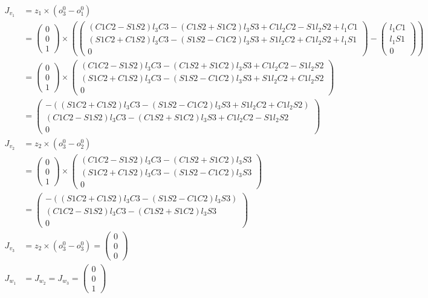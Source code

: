 \begin{align*}
J_{v_1} &= 
z_1\times (o_3^0-o_1^0)\\
 &=
\begin{pmatrix}
0 \\ 0 \\ 1
\end{pmatrix}\times\left(
\begin{pmatrix}
(C1C2-S1S2)l_3 C3-(C1S2+S1C2)l_3 S3+C1l_2C2-S1l_2S2+l_1C1 \\ (S1C2+C1S2)l_3 C3-(S1S2-C1C2)l_3 S3+S1l_2C2+C1l_2S2+l_1S1 \\ 0
\end{pmatrix}-
\begin{pmatrix}
l_1C1 \\ l_1S1 \\ 0
\end{pmatrix}
\right)\\
&=
\begin{pmatrix}
0 \\ 0 \\ 1
\end{pmatrix}\times
\begin{pmatrix}
(C1C2-S1S2)l_3 C3-(C1S2+S1C2)l_3 S3+C1l_2C2-S1l_2S2 \\ (S1C2+C1S2)l_3 C3-(S1S2-C1C2)l_3 S3+S1l_2C2+C1l_2S2 \\ 0
\end{pmatrix}
\\
&=
\begin{pmatrix}
-((S1C2+C1S2)l_3 C3-(S1S2-C1C2)l_3 S3+S1l_2C2+C1l_2S2) \\ (C1C2-S1S2)l_3 C3-(C1S2+S1C2)l_3 S3+C1l_2C2-S1l_2S2 \\ 0
\end{pmatrix}\\
J_{v_2} &= 
z_2\times (o_3^0-o_2^0)\\
&=
\begin{pmatrix}
0 \\ 0 \\ 1
\end{pmatrix}\times
\begin{pmatrix}
(C1C2-S1S2)l_3 C3-(C1S2+S1C2)l_3 S3 \\ (S1C2+C1S2)l_3 C3-(S1S2-C1C2)l_3 S3 \\ 0
\end{pmatrix}\\
&=
\begin{pmatrix}
-((S1C2+C1S2)l_3 C3-(S1S2-C1C2)l_3 S3) \\ (C1C2-S1S2)l_3 C3-(C1S2+S1C2)l_3 S3 \\ 0
\end{pmatrix}\\
J_{v_3} &= 
z_2\times (o_3^0-o_3^0)
=
\begin{pmatrix}
0 \\ 0 \\ 0
\end{pmatrix}\\
J_{w_1} &= J_{w_2} = J_{w_3} = 
\begin{pmatrix}
0 \\ 0 \\ 1
\end{pmatrix}
\end{align*}


